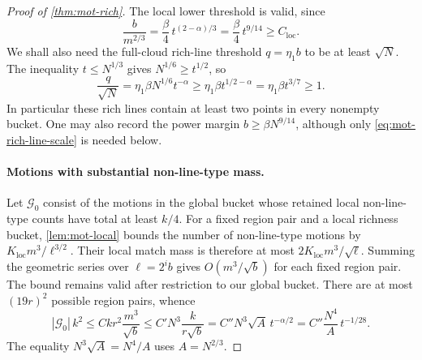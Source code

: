 \begin{proof}[Proof of \cref{thm:mot-rich}]
The local lower threshold is valid, since
\begin{equation}
\label{eq:mot-local-scale-check}
 \frac{b}{m^{2/3}}
 =\frac\beta4\,t^{(2-\alpha)/3}
 =\frac\beta4\,t^{9/14}
 \ge C_{\mathrm{loc}}.
\end{equation}
We shall also need the full-cloud rich-line threshold $q=\eta_1b$ to be at least $\sqrt N$.  The inequality $t\le N^{1/3}$ gives $N^{1/6}\ge t^{1/2}$, so
\begin{equation}
\label{eq:mot-rich-line-scale}
 \frac{q}{\sqrt N}
 =\eta_1\beta N^{1/6}t^{-\alpha}
 \ge\eta_1\beta t^{1/2-\alpha}
 =\eta_1\beta t^{3/7}\ge1.
\end{equation}
In particular these rich lines contain at least two points in every nonempty bucket.  One may also record the power margin $b\ge\beta N^{9/14}$, although only \eqref{eq:mot-rich-line-scale} is needed below.

\paragraph{Motions with substantial non-line-type mass.}
Let $\mathcal{G}_0$ consist of the motions in the global bucket whose retained local non-line-type counts have total at least $k/4$.  For a fixed region pair and a local richness bucket, \cref{lem:mot-local} bounds the number of non-line-type motions by $K_{\mathrm{loc}}m^3/\ell^{3/2}$.  Their local match mass is therefore at most $2K_{\mathrm{loc}}m^3/\sqrt\ell$. Summing the geometric series over $\ell=2^i b$ gives $O(m^3/\sqrt b)$ for each fixed region pair.  The bound remains valid after restriction to our global bucket.  There are at most $(19r)^2$ possible region pairs, whence
\begin{equation}
\label{eq:mot-nonline-mass}
 |\mathcal{G}_0|\,k^2
 \le C k r^2\frac{m^3}{\sqrt b}
 \le C' N^3\frac{k}{r\sqrt b}
 =C''N^3\sqrt A\,t^{-\alpha/2}
 =C''\frac{N^4}{A}\,t^{-1/28}.
\end{equation}
The equality $N^3\sqrt A=N^4/A$ uses $A=N^{2/3}$.


\end{proof}
